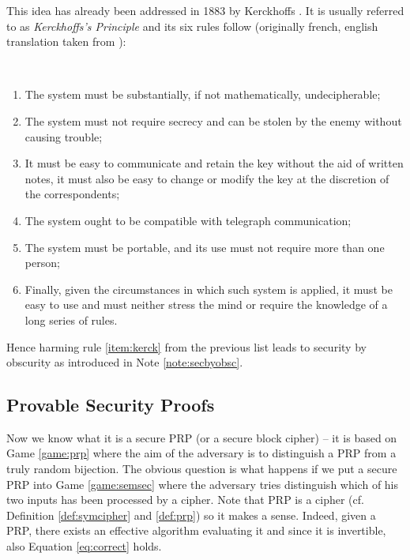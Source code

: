 This idea has already been addressed in 1883 by Kerckhoffs \cite{auguste1883cryptographie}. It is usually referred to as {\em Kerckhoffs's Principle} and its six rules follow (originally french, english translation taken from \cite{petitcolas2016kerckhoffs}):
\begin{princ}[Kerckhoffs]
	~
	\begin{enumerate}
		\item The system must be substantially, if not mathematically, undecipherable;
		\item The system must not require secrecy and can be stolen by the enemy without causing trouble;\label{item:kerck}
		\item It must be easy to communicate and retain the key without the aid of written notes, it must also be easy to change or modify the key at the discretion of the correspondents;
		\item The system ought to be compatible with telegraph communication;
		\item The system must be portable, and its use must not require more than one person;
		\item Finally, given the circumstances in which such system is applied, it must be easy to use and must neither stress the mind or require the knowledge of a long series of rules.
	\end{enumerate}
\end{princ}
Hence harming rule \ref{item:kerck} from the previous list leads to security by obscurity as introduced in Note \ref{note:secbyobsc}.



\subsection{Provable Security Proofs}

Now we know what it is a secure PRP (or a secure block cipher) -- it is based on Game \ref{game:prp} where the aim of the adversary is to distinguish a PRP from a truly random bijection. The obvious question is what happens if we put a secure PRP into Game \ref{game:semsec} where the adversary tries distinguish which of his two inputs has been processed by a cipher. Note that PRP is a cipher (cf. Definition \ref{def:symcipher} and \ref{def:prp}) so it makes a sense. Indeed, given a PRP, there exists an effective algorithm evaluating it and since it is invertible, also Equation \ref{eq:correct} holds.

